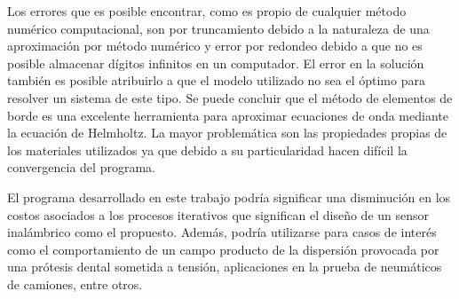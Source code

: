 \documentclass[12pt,letterpaper]{article}
\numberwithin{equation}{section}
\begin{document}
Los errores que es posible encontrar, como es propio de cualquier método numérico computacional, son por truncamiento debido a la naturaleza de una aproximación por método numérico y error por redondeo debido a que no es posible almacenar dígitos infinitos en un computador. El error en la solución también es posible atribuirlo a que el modelo utilizado no sea el óptimo para resolver un sistema de este tipo. Se puede concluir que el método de elementos de borde es una excelente herramienta para aproximar ecuaciones de onda mediante la ecuación de Helmholtz. La mayor problemática son las propiedades propias de los materiales utilizados ya que debido a su particularidad hacen difícil la convergencia del programa.

El programa desarrollado en este trabajo podría significar una disminución en los costos asociados a los procesos iterativos que significan el diseño de un sensor inalámbrico como el propuesto. Además, podría utilizarse para casos de interés como el comportamiento de un campo producto de la dispersión provocada por una prótesis dental sometida a tensión, aplicaciones en la prueba de neumáticos de camiones, entre otros.

\pagebreak
{}%
\end{document}
